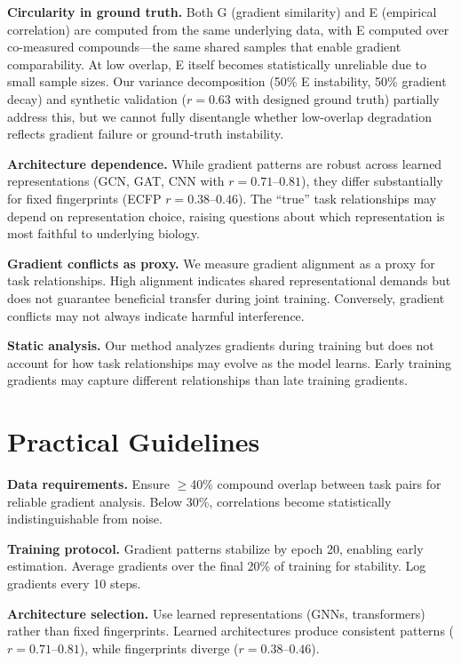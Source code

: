 \documentclass{article}
\begin{document}
\textbf{Circularity in ground truth.} Both G (gradient similarity) and E (empirical correlation) are computed from the same underlying data, with E computed over co-measured compounds---the same shared samples that enable gradient comparability. At low overlap, E itself becomes statistically unreliable due to small sample sizes. Our variance decomposition (50\% E instability, 50\% gradient decay) and synthetic validation ($r=0.63$ with designed ground truth) partially address this, but we cannot fully disentangle whether low-overlap degradation reflects gradient failure or ground-truth instability.

\textbf{Architecture dependence.} While gradient patterns are robust across learned representations (GCN, GAT, CNN with $r = 0.71$--$0.81$), they differ substantially for fixed fingerprints (ECFP $r = 0.38$--$0.46$). The ``true'' task relationships may depend on representation choice, raising questions about which representation is most faithful to underlying biology.

\textbf{Gradient conflicts as proxy.} We measure gradient alignment as a proxy for task relationships. High alignment indicates shared representational demands but does not guarantee beneficial transfer during joint training. Conversely, gradient conflicts may not always indicate harmful interference.

\textbf{Static analysis.} Our method analyzes gradients during training but does not account for how task relationships may evolve as the model learns. Early training gradients may capture different relationships than late training gradients.

\section{Practical Guidelines}
\label{app:guidelines}

\textbf{Data requirements.} Ensure $\geq$40\% compound overlap between task pairs for reliable gradient analysis. Below 30\%, correlations become statistically indistinguishable from noise.

\textbf{Training protocol.} Gradient patterns stabilize by epoch 20, enabling early estimation. Average gradients over the final 20\% of training for stability. Log gradients every 10 steps.

\textbf{Architecture selection.} Use learned representations (GNNs, transformers) rather than fixed fingerprints. Learned architectures produce consistent patterns ($r = 0.71$--$0.81$), while fingerprints diverge ($r = 0.38$--$0.46$).
\end{document}
